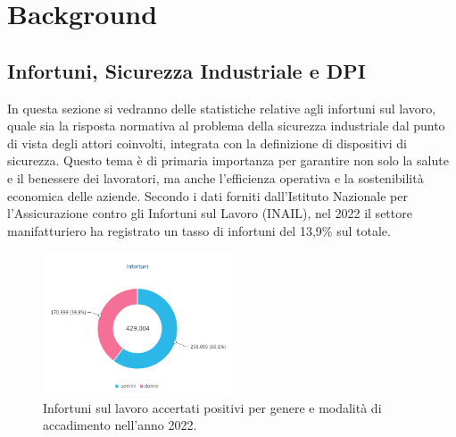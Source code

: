 \chapter{Background}

\section{Infortuni, Sicurezza Industriale e DPI}


In questa sezione si vedranno delle statistiche relative agli infortuni sul lavoro, quale sia la risposta normativa al problema della sicurezza industriale dal punto di vista degli attori coinvolti, integrata con la definizione di dispositivi di sicurezza. Questo tema è di primaria importanza per garantire non solo la salute e il benessere dei lavoratori, ma anche l'efficienza operativa e la sostenibilità economica delle aziende. Secondo i dati forniti dall'Istituto Nazionale per l'Assicurazione contro gli Infortuni sul Lavoro (INAIL), nel 2022 il settore manifatturiero ha registrato un tasso di infortuni del 13,9\% sul totale\cite{a1inail2023}.

\begin{figure}[htbp]
    \centering
    \includegraphics[width=0.5\textwidth]{figures/totaleinfortuni.png}
    \caption{Infortuni sul lavoro accertati positivi per genere
e modalità di accadimento nell'anno 2022.}
    \label{fig:infortot}
\end{figure}

